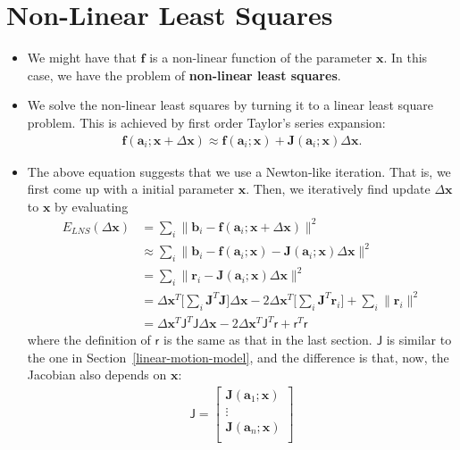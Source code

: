 \documentclass[10pt]{article}
\newcommand{\ve}[1]{\mathbf{#1}}
\newcommand{\msf}[1]{\mathsf{#1}}
\begin{document}
  
  \section{Non-Linear Least Squares}
  
  \begin{itemize}
    \item We might have that $\ve{f}$ is a non-linear function of
      the parameter $\ve{x}$.
      In this case, we have the problem of {\bf non-linear least squares}.
      
    \item We solve the non-linear least squares by turning it to a
      linear least square problem. This is achieved by first order 
      Taylor's series expansion:
      \begin{align*}
        \ve{f}(\ve{a}_i; \ve{x} + \Delta \ve{x})
        \approx \ve{f}(\ve{a}_i; \ve{x} ) + 
          \ve{J}(\ve{a}_i;\ve{x}) \Delta \ve{x}.
      \end{align*}
      
    \item The above equation suggests that we use a Newton-like
      iteration. That is, we first come up with a initial parameter $\ve{x}$. 
      Then, we iteratively
      find update $\Delta \ve{x}$ to $\ve{x}$ by evaluating
      \begin{align*}
        E_{LNS}(\Delta \ve{x})
        &= \sum_i \| \ve{b}_i - 
          \ve{f}(\ve{a}_i;\ve{x} + \Delta \ve{x}) \|^2\\
        &\approx  \sum_i \| \ve{b}_i - 
          \ve{f}(\ve{a}_i;\ve{x}) - 
          \ve{J}(\ve{a}_i;\ve{x})\Delta \ve{x} \|^2\\
        &= \sum_i \| \ve{r}_i - \ve{J}(\ve{a}_i;\ve{x})\Delta \ve{x} \|^2\\
        &= \Delta \ve{x}^T \bigg[ \sum_i \ve{J}^T \ve{J} \bigg] \Delta \ve{x}
          - 2 \Delta \ve{x}^T \bigg[ \sum_i \ve{J}^T \ve{r}_i \bigg]
          + \sum_i \| \ve{r}_i \|^2\\
        &= \Delta \ve{x}^T \msf{J}^T \msf{J} \Delta \ve{x}
          - 2 \Delta \ve{x}^T \msf{J}^T \msf{r}
          + \msf{r}^T \msf{r}
      \end{align*}
      where the definition of $\msf{r}$ is the same
      as that in the last section. $\msf{J}$ is similar to the one in
      Section~\ref{linear-motion-model}, and the difference is that, now,
      the Jacobian also depends on $\ve{x}:$
      \begin{align*}
        \msf{J}
        = \begin{bmatrix}
          \ve{J}(\ve{a}_1; \ve{x})\\
          \vdots\\
          \ve{J}(\ve{a}_n; \ve{x})\\
        \end{bmatrix}
      \end{align*}
      

\end{itemize}
\end{document}
